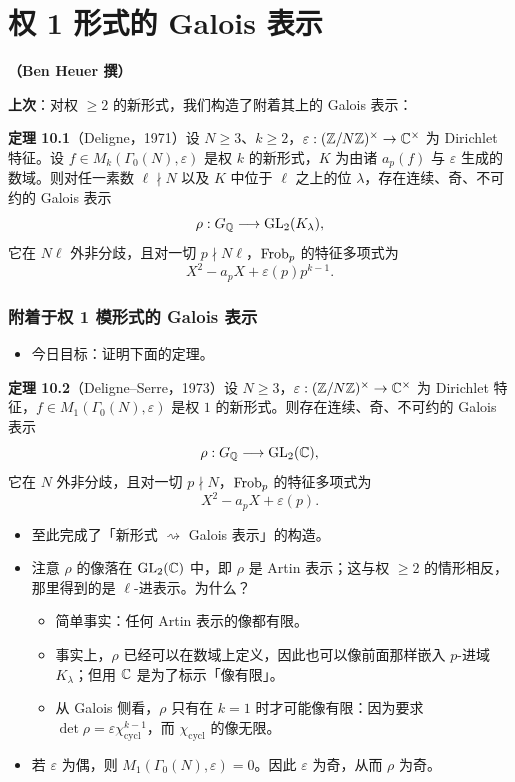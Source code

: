 \chapter{权 1 形式的 Galois 表示}
\noindent\textbf{（Ben Heuer 撰）}

\noindent\textbf{上次}：对权 $\ge 2$ 的新形式，我们构造了附着其上的 Galois 表示：

\noindent\textbf{定理 10.1}（Deligne，1971）\label{thm:10.1}\quad 设 $N\ge 3$、$k\ge 2$，$\varepsilon:(\mathbb{Z}/N\mathbb{Z})^\times\to\mathbb{C}^\times$ 为 Dirichlet 特征。设 $f\in M_k(\Gamma_0(N),\varepsilon)$ 是权 $k$ 的新形式，$K$ 为由诸 $a_p(f)$ 与 $\varepsilon$ 生成的数域。则对任一素数 $\ell\nmid N$ 以及 $K$ 中位于 $\ell$ 之上的位 $\lambda$，存在连续、奇、不可约的 Galois 表示
\[
\rho:G_{\mathbb{Q}}\longrightarrow\operatorname{GL}_2(K_\lambda),
\]
它在 $N\ell$ 外非分歧，且对一切 $p\nmid N\ell$，$\operatorname{Frob}_p$ 的特征多项式为
\[
X^2-a_pX+\varepsilon(p)p^{k-1}.
\]

\subsection*{附着于权 1 模形式的 Galois 表示}

\begin{itemize}
\item 今日目标：证明下面的定理。
\end{itemize}

\noindent\textbf{定理 10.2}（Deligne--Serre，1973）\label{thm:10.2}\quad 设 $N\ge 3$，$\varepsilon:(\mathbb{Z}/N\mathbb{Z})^\times\to\mathbb{C}^\times$ 为 Dirichlet 特征，$f\in M_1(\Gamma_0(N),\varepsilon)$ 是权 $1$ 的新形式。则存在连续、奇、不可约的 Galois 表示
\[
\rho:G_{\mathbb{Q}}\longrightarrow\operatorname{GL}_2(\mathbb{C}),
\]
它在 $N$ 外非分歧，且对一切 $p\nmid N$，$\operatorname{Frob}_p$ 的特征多项式为
\[
X^2-a_pX+\varepsilon(p).
\]

\begin{itemize}
\item 至此完成了「新形式 $\rightsquigarrow$ Galois 表示」的构造。
\item 注意 $\rho$ 的像落在 $\operatorname{GL}_2(\mathbb{C})$ 中，即 $\rho$ 是 Artin 表示；这与权 $\ge 2$ 的情形相反，那里得到的是 $\ell$-进表示。为什么？
\begin{itemize}
\item 简单事实：任何 Artin 表示的像都有限。
\item 事实上，$\rho$ 已经可以在数域上定义，因此也可以像前面那样嵌入 $p$-进域 $K_\lambda$；但用 $\mathbb{C}$ 是为了标示「像有限」。
\item 从 Galois 侧看，$\rho$ 只有在 $k=1$ 时才可能像有限：因为要求 $\det\rho=\varepsilon\chi_{\mathrm{cycl}}^{k-1}$，而 $\chi_{\mathrm{cycl}}$ 的像无限。
\end{itemize}
\item 若 $\varepsilon$ 为偶，则 $M_1(\Gamma_0(N),\varepsilon)=0$。因此 $\varepsilon$ 为奇，从而 $\rho$ 为奇。
\end{itemize}

